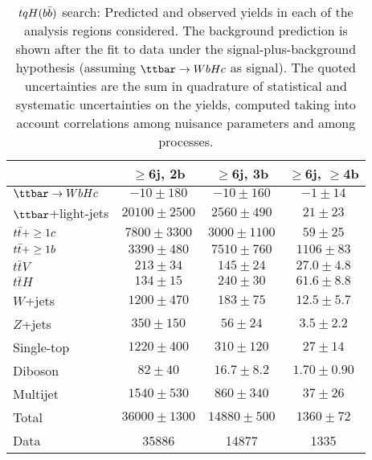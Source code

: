 \begin{table}[htbp]
\begin{center}
\begin{tabular}{l*{3}{c}}
\hline\hline
 & $\geq$6j, 2b & $\geq$6j, 3b & $\geq$6j, $\geq$4b \\
\hline
$\Hc$  &   $ -10 \pm 180 $ &   $ -10 \pm 160 $ &   $ -1 \pm 14 $ \\ 
\hline
$\ttbar$+light-jets  &   $ 20100 \pm 2500 $ &   $ 2560 \pm 490 $ &   $ 21 \pm 23 $ \\ 
$t\bar{t}+\geq1c$  &   $ 7800 \pm 3300 $ &   $ 3000 \pm 1100 $ &   $ 59 \pm 25 $ \\ 
$t\bar{t}+\geq1b$  &   $ 3390 \pm 480 $ &   $ 7510 \pm 760 $ &   $ 1106 \pm 83 $ \\ 
$t\bar{t}V$  &   $ 213 \pm 34 $ &   $ 145 \pm 24 $ &   $ 27.0 \pm 4.8 $ \\ 
$t\bar{t}H$  &   $ 134 \pm 15 $ &   $ 240 \pm 30 $ &   $ 61.6 \pm 8.8 $ \\ 
$W$+jets  &   $ 1200 \pm 470 $ &   $ 183 \pm 75 $ &   $ 12.5 \pm 5.7 $ \\ 
$Z$+jets  &   $ 350 \pm 150 $ &   $ 56 \pm 24 $ &   $ 3.5 \pm 2.2 $ \\ 
Single-top  &   $ 1220 \pm 400 $ &   $ 310 \pm 120 $ &   $ 27 \pm 14 $ \\ 
Diboson  &   $ 82 \pm 40 $ &   $ 16.7 \pm 8.2 $ &   $ 1.70 \pm 0.90 $ \\ 
Multijet  &   $ 1540 \pm 530 $ &   $ 860 \pm 340 $ &   $ 37 \pm 26 $ \\ 
\hline
Total &   $ 36000 \pm 1300 $ &   $ 14880 \pm 500 $ &   $ 1360 \pm 72 $ \\ 
\hline
Data & 35886  & 14877  & 1335  \\
\hline\hline      
\end{tabular}

%
\end{center}
\caption{
$tqH(b\bar{b})$ search: Predicted and observed yields in each of the analysis regions considered.
The background prediction is shown after the fit to data under the signal-plus-background hypothesis 
(assuming $\Hc$ as signal).
The quoted uncertainties are the sum in quadrature of statistical and systematic uncertainties on the yields, 
computed taking into account correlations among nuisance parameters and among processes.
}
\label{tab:Hbb_Postfit_Yields_Unblind_Hc}
\end{table}


